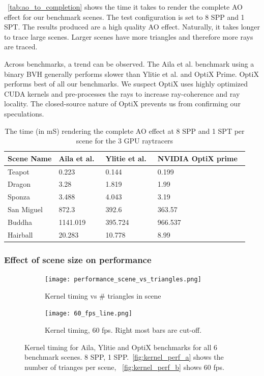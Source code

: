 ~\autoref{tab:ao_to_completion} shows the time it takes to render the complete AO effect for our benchmark scenes. The test configuration is set to 8 SPP and 1 SPT. The results produced are a high quality AO effect. 
Naturally, it takes longer to trace large scenes. Larger scenes have more triangles and therefore more rays are traced.

Across benchmarks, a trend can be observed. The Aila et al. benchmark using a binary BVH generally performs slower than Ylitie et al. and OptiX Prime. OptiX performs best of all our benchmarks. We suspect OptiX uses highly optimized CUDA kernels and pre-processes the rays to increase ray-coherence and ray locality. The closed-source nature of OptiX prevents us from confirming our speculations.

\begin{table}
\begin{tabular}{ |p{3cm}||p{3cm}|p{3cm}|p{3cm}|  }
 \hline
 Scene Name & Aila et al.~\cite{Aila:2009:UER:1572769.1572792} & Ylitie et al.~\cite{Ylitie:2017:EIR:3105762.3105773} & NVIDIA OptiX prime~\cite{Parker:2010:OGP:1778765.1778803} \\
 \hline
 Teapot     & 0.223   & 0.144  & 0.199 \\
 Dragon     & 3.28    & 1.819   & 1.99 \\
 Sponza     & 3.488    & 4.043   & 3.19 \\ 
 San Miguel & 872.3 & 392.6  & 363.57 \\
 Buddha     & 1141.019   & 395.724  & 966.537 \\
 Hairball   & 20.283 & 10.778  & 8.99 \\
 \hline
\end{tabular}
\caption{\label{tab:ao_to_completion}The time (in mS) rendering the complete AO effect at 8 SPP and 1 SPT per scene for the 3 GPU raytracers}
\end{table}

\subsubsection{Effect of scene size on performance}
\label{subsec:scene_size_perf_res}

\begin{figure}[htb]
  \begin{subfigure}{0.49\textwidth}
  \texttt{[image: performance\_scene\_vs\_triangles.png]}
  \caption{\label{fig:kernel_perf_a}Kernel timing vs \# triangles in scene}
  \end{subfigure}
  \hspace*{\fill} %
  \begin{subfigure}{0.49\textwidth}
  \texttt{[image: 60\_fps\_line.png]}
  \caption{\label{fig:kernel_perf_b}Kernel timing, 60 fps. Right most bars are cut-off.}
  \end{subfigure}

  \caption{\label{fig:kernel_perf}
           Kernel timing for Aila, Ylitie and OptiX benchmarks for all 6 benchmark scenes. 8 SPP, 1 SPP.~\autoref{fig:kernel_perf_a} shows the number of trianges per scene, ~\autoref{fig:kernel_perf_b} shows 60 fps.
           }
\end{figure}

